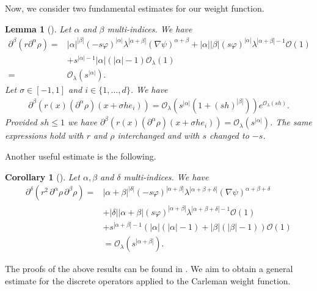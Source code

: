 \documentclass[11pt,oneside,leqno]{amsart}
\numberwithin{equation}{section}
\numberwithin{equation}{section}
\newtheorem{lemma}[theorem]{Lemma}
\newtheorem{corollary}[theorem]{Corollary}
\begin{document}
Now, we consider two fundamental estimates for our weight function. 
\begin{lemma}[{\cite[Lemma 3.7]{BHLR:2010}}] \label{lem:derivative:wrt:x}
Let $\alpha$ and $\beta$ multi-indices. We have
\begin{align*}
\partial^{\beta}(r\partial^{\alpha} \rho)=&|\alpha|^{|\beta|}(-s\varphi)^{|\alpha|}\lambda^{|\alpha+\beta|}(\nabla \psi)^{\alpha+\beta}+|\alpha||\beta|(s\varphi)^{|\alpha|}\lambda^{|\alpha+\beta|-1}\mathcal{O}(1)\\
&+s^{|\alpha|-1}|\alpha|(|\alpha|-1)\mathcal{O}_{\lambda}(1)\\
=&\mathcal{O}_{\lambda}(s^{|\alpha|}).
\end{align*}
Let $\sigma\in [-1,1]$ and $i\in\{1,\ldots,d\}$. We have
\begin{equation}
\begin{split}
\partial^{\beta}\left( r(x)(\partial^{\alpha}\rho)(x+\sigma he_{i})\right)=\mathcal{O}_{\lambda}(s^{|\alpha|}(1+(sh)^{|\beta|}))e^{\mathcal{O}_{\lambda}(sh)}.
\end{split}
\end{equation}
Provided $sh\leq1$ we have $\partial^{\beta}\left( r(x)(\partial^{\alpha}\rho)(x+\sigma he_{i})\right)=\mathcal{O}_{\lambda}(s^{|\alpha|})$. The same expressions hold with $r$ and $\rho$ interchanged and with $s$ changed to $-s$.
\end{lemma}
Another useful estimate is the following. 
\begin{corollary}[{\cite[Corollary 3.8]{BHLR:2010}}]\label{Cor:derivative:wrt:x:2r}
Let $\alpha,\beta$ and $\delta$ multi-indices. We have
\begin{equation}
\begin{split}
\partial^{\delta}\left(r^{2}\,\partial^{\alpha}\rho\, \partial^{\beta}\rho\right)=&|\alpha+\beta|^{|\delta|}(-s\varphi)^{|\alpha+\beta|}\lambda^{|\alpha+\beta+\delta|}(\nabla\psi)^{\alpha+\beta+\delta}\\
&+|\delta||\alpha+\beta|(s\varphi)^{|\alpha+\beta|}\lambda^{|\alpha+\beta+\delta|-1}\mathcal{O}(1)\\
&+s^{|\alpha+\beta|-1}\left( |\alpha|(|\alpha|-1)+|\beta|(|\beta|-1)\right)\mathcal{O}(1)\\
&=\mathcal{O}_{\lambda}(s^{|\alpha+\beta|}).
\end{split}
\end{equation}
\end{corollary}
The proofs of the above results can be found in \cite{BHLR:2010}. We aim to obtain a general estimate for the discrete operators applied to the Carleman weight function.
\end{document}
